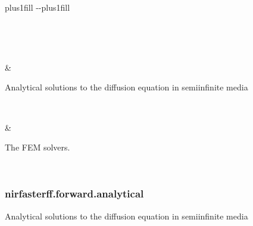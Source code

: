 \documentclass[letterpaper,10pt,english]{sphinxmanual}
\begin{document}
\begin{savenotes}
\sphinxatlongtablestart
\sphinxthistablewithglobalstyle
\sphinxthistablewithnovlinesstyle
\makeatletter
  \LTleft \@totalleftmargin plus1fill
  \LTright\dimexpr\columnwidth-\@totalleftmargin-\linewidth\relax plus1fill
\makeatother
\begin{longtable}{}
\sphinxtoprule
\endfirsthead

\\
\sphinxtoprule
\endhead

\sphinxbottomrule
{}\\
\endfoot

\endlastfoot
\sphinxtableatstartofbodyhook
\begin{varwidth}[t]{}
\sphinxAtStartPar
{\hyperref[\detokenize{_autosummary/nirfasterff.forward.analytical:module-nirfasterff.forward.analytical}]{}}
\sphinxbeforeendvarwidth
\end{varwidth}%
&\begin{varwidth}[t]{}
\sphinxAtStartPar
Analytical solutions to the diffusion equation in semi\sphinxhyphen{}infinite media
\sphinxbeforeendvarwidth
\end{varwidth}%
\\
\sphinxhline\begin{varwidth}[t]{}
\sphinxAtStartPar
{\hyperref[\detokenize{_autosummary/nirfasterff.forward.femdata:module-nirfasterff.forward.femdata}]{}}
\sphinxbeforeendvarwidth
\end{varwidth}%
&\begin{varwidth}[t]{}
\sphinxAtStartPar
The FEM solvers.
\sphinxbeforeendvarwidth
\end{varwidth}%
\\
\sphinxbottomrule
\end{longtable}
\sphinxtableafterendhook
\sphinxatlongtableend
\end{savenotes}

\sphinxstepscope


\subsubsection{nirfasterff.forward.analytical}
\label{\detokenize{_autosummary/nirfasterff.forward.analytical:module-nirfasterff.forward.analytical}}\label{\detokenize{_autosummary/nirfasterff.forward.analytical:nirfasterff-forward-analytical}}\label{\detokenize{_autosummary/nirfasterff.forward.analytical::doc}}
\sphinxAtStartPar
Analytical solutions to the diffusion equation in semi\sphinxhyphen{}infinite media
\end{document}
